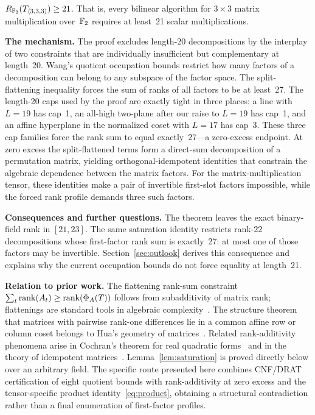 \documentclass[11pt,a4paper]{article}
\begin{document}
\begin{theorem}\label{thm:main}
  $R_{\mathbb{F}_2}(T_{\langle3,3,3\rangle})\ge 21$.  That is, every bilinear algorithm for $3\times 3$ matrix multiplication over~$\mathbb{F}_2$ requires at least~21 scalar multiplications.
\end{theorem}

\noindent\textbf{The mechanism.}\quad
The proof excludes length-20 decompositions by the interplay of two constraints that are individually insufficient but complementary at length~20.  Wang's quotient occupation bounds restrict how many factors of a decomposition can belong to any subspace of the factor space.  The split-flattening inequality forces the sum of ranks of all factors to be at least~27.  The length-20 caps used by the proof are exactly tight in three places: a line with $L=19$ has cap~1, an all-high two-plane after our raise to $L=19$ has cap~1, and an affine hyperplane in the normalized coset with $L=17$ has cap~3.  These three cap families force the rank sum to equal exactly~27---a zero-excess endpoint.  At zero excess the split-flattened terms form a direct-sum decomposition of a permutation matrix, yielding orthogonal-idempotent identities that constrain the algebraic dependence between the matrix factors.  For the matrix-multiplication tensor, these identities make a pair of invertible first-slot factors impossible, while the forced rank profile demands three such factors.

\noindent\textbf{Consequences and further questions.}\quad
The theorem leaves the exact binary-field rank in $[21,23]$. The same
saturation identity restricts rank-22 decompositions whose first-factor
rank sum is exactly~27: at most one of those factors may be invertible.
Section~\ref{sec:outlook} derives this consequence and explains why the
current occupation bounds do not force equality at length~21.

\noindent\textbf{Relation to prior work.}\quad
The flattening rank-sum constraint $\sum_t\operatorname{rank}(A_t)\ge\operatorname{rank}(\Phi_A(T))$ follows from subadditivity of matrix rank; flattenings are standard tools in algebraic complexity~\cite{burgisser1997algebraic,blaser1999focs}. The structure theorem that matrices with pairwise rank-one differences lie in a common affine row or column coset belongs to Hua's geometry of matrices~\cite{hua1945geometries,wan1996geometry,pazzis2015hua}. Related rank-additivity phenomena arise in Cochran's theorem for real quadratic forms~\cite{cochran1934distribution} and in the theory of idempotent matrices~\cite{tian2001rank}. Lemma~\ref{lem:saturation} is proved directly below over an arbitrary field. The specific route presented here combines CNF/DRAT certification of eight quotient bounds with rank-additivity at zero excess and the tensor-specific product identity~\eqref{eq:product}, obtaining a structural contradiction rather than a final enumeration of first-factor profiles.
\end{document}
